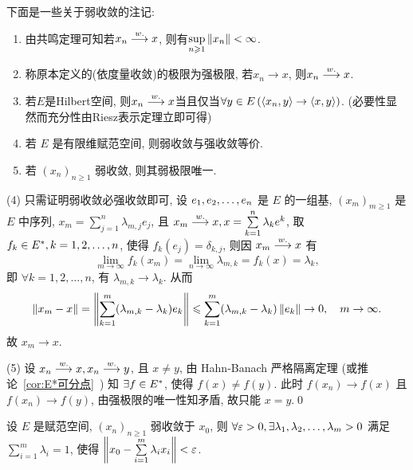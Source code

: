 	\begin{Remark}
		下面是一些关于弱收敛的注记:
		\begin{enumerate}[(1)]
			\item 由共鸣定理可知若$ x_n\weakto x $, 则有$ \sup\limits_{n\geqslant 1}\norm{x_n}<\infty $.
			\item 称原本定义的(依度量收敛)的极限为强极限, 若$ x_n\to x $, 则$ x_n\weakto x $.
			\item 若$ E $是Hilbert空间, 则$ x_n\weakto x $当且仅当$ \forall y\in E\,(\lrangle{x_n,y}\to\lrangle{x,y}) $. (必要性显然而充分性由Riesz表示定理立即可得)
			\item 若 $ E $ 是有限维赋范空间, 则弱收敛与强收敛等价.
			\item 若 $ (x_{n})_{n\geqslant1} $ 弱收敛, 则其弱极限唯一.
		\end{enumerate}
	\end{Remark}

	\begin{Proof}
		(4) 只需证明弱收敛必强收敛即可, 设 $ \seq{e} $ 是 $ E $ 的一组基, $ (x_{m})_{m\geqslant1} $ 是 $ E $ 中序列, $ x_{m}=\sum\limits_{j=1}^{n}\lambda_{m, j}e_{j} $, 且 $ x_{m}\weakto x, x=\sum\limits_{k=1}^{n}\lambda_{k}e^{k} $, 取 $ f_{k}\in\Star{E}, k = 1, 2, \dots, n $, 使得 $ f_{k}(e_{j})=\delta_{k, j} $, 则因 $ x_{m}\weakto x $ 有
		\[
			\lim_{m\to\infty}f_{k}(x_{m})=\lim_{n\to\infty}\lambda_{m, k}=f_{k}(x)=\lambda_{k},
		\]
		即 $ \forall k=1, 2, \dots, n $, 有 $ \lambda_{m, k}\to \lambda_{k} $. 从而
		\[
			\norm{x_{m}-x}=\norm{\sum_{k=1}^{m}(\lambda_{m, k}-\lambda_{k})e_{k}}\leqslant\sum_{k=1}^{m}(\lambda_{m, k}-\lambda_{k})\norm{e_{k}}\to 0, \quad m\to \infty.
		\]
		故 $ x_{m}\to x $.

		(5) 设 $ x_{n}\weakto x, x_{n}\weakto y $, 且 $ x\ne y $, 由 Hahn-Banach 严格隔离定理 (或推论~\ref{cor:E*可分点}~) 知 $ \exists f\in\Star{E} $, 使得 $ f(x)\ne f(y) $. 此时 $ f(x_{n})\to f(x) $ 且 $ f(x_{n})\to f(y) $, 由强极限的唯一性知矛盾, 故只能 $ x=y $.\qed
	\end{Proof}

	\begin{Theorem}[Mazur]
		设 $ E $ 是赋范空间,  $ (x_{n})_{n\geqslant1} $ 弱收敛于 $ x_{0} $, 则 $ \forall \varepsilon>0, \exists\seq[m]{\lambda}>0 $ 满足 $ \sum\limits_{i=1}^{m}\lambda_{i}=1 $, 使得 $ \norm{x_{0}-\sum\limits_{i=1}^{m}\lambda_{i}x_{i}}<\varepsilon $.
	\end{Theorem}

